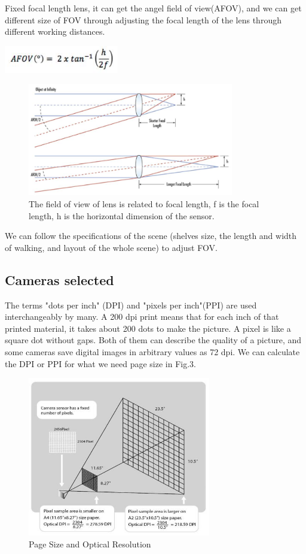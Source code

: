 Fixed focal length lens, it can get the angel field of view(AFOV), and we can get different size of FOV through adjusting the focal length of the lens through different working distances.

\centerline{\includegraphics[width=5cm,scale=0.9]{AFOV-MA.jpg}}
\begin{figure}[htbp]
\centerline{\includegraphics[width=9cm,scale=0.9]{AFOV.jpg}}
\caption{The field of view of lens is related to focal length, f is the focal length, h is the horizontal dimension of the sensor.}
\label{fig}
\end{figure}

We can follow the specifications of the scene (shelves size, the length and width of walking, and layout of the whole scene) to adjust FOV.


\subsection{Cameras selected}

The terms "dots per inch" (DPI) and "pixels per inch"(PPI) are used interchangeably by many. A 200 dpi print means that for each inch of that printed material, it takes about 200 dots to make the picture. A pixel is like a square dot without gaps. Both of them can describe the quality of a picture, and some cameras save digital images in arbitrary values as 72 dpi. We can calculate the DPI or PPI for what we need page size in Fig.3.
\begin{figure}[htbp]
\centerline{\includegraphics[width=8cm,scale=0.9]{DPIPPI.jpg}}
\caption{Page Size and Optical Resolution}
\label{fig}
\end{figure}


